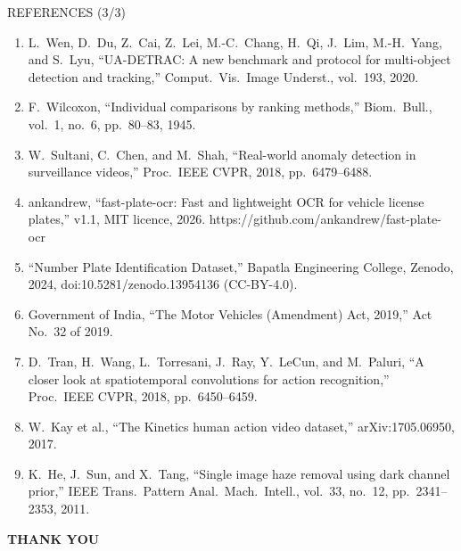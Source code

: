 \documentclass[aspectratio=169,10pt,t]{beamer}
\begin{document}
\begin{frame}{REFERENCES (3/3)}
\scriptsize
\begin{enumerate}\setlength{\itemsep}{0.05em}
\item[{[21]}] L.\ Wen, D.\ Du, Z.\ Cai, Z.\ Lei, M.-C.\ Chang, H.\ Qi, J.\ Lim, M.-H.\ Yang, and S.\ Lyu, ``UA-DETRAC: A new benchmark and protocol for multi-object detection and tracking,'' Comput.\ Vis.\ Image Underst., vol.\ 193, 2020.
\item[{[22]}] F.\ Wilcoxon, ``Individual comparisons by ranking methods,'' Biom.\ Bull., vol.\ 1, no.\ 6, pp.\ 80--83, 1945.
\item[{[23]}] W.\ Sultani, C.\ Chen, and M.\ Shah, ``Real-world anomaly detection in surveillance videos,'' Proc.\ IEEE CVPR, 2018, pp.\ 6479--6488.
\item[{[24]}] ankandrew, ``fast-plate-ocr: Fast and lightweight OCR for vehicle license plates,'' v1.1, MIT licence, 2026. https://github.com/ankandrew/fast-plate-ocr
\item[{[25]}] ``Number Plate Identification Dataset,'' Bapatla Engineering College, Zenodo, 2024, doi:10.5281/zenodo.13954136 (CC-BY-4.0).
\item[{[26]}] Government of India, ``The Motor Vehicles (Amendment) Act, 2019,'' Act No.\ 32 of 2019.
\item[{[27]}] D.\ Tran, H.\ Wang, L.\ Torresani, J.\ Ray, Y.\ LeCun, and M.\ Paluri, ``A closer look at spatiotemporal convolutions for action recognition,'' Proc.\ IEEE CVPR, 2018, pp.\ 6450--6459.
\item[{[28]}] W.\ Kay et al., ``The Kinetics human action video dataset,'' arXiv:1705.06950, 2017.
\item[{[29]}] K.\ He, J.\ Sun, and X.\ Tang, ``Single image haze removal using dark channel prior,'' IEEE Trans.\ Pattern Anal.\ Mach.\ Intell., vol.\ 33, no.\ 12, pp.\ 2341--2353, 2011.
\end{enumerate}
\end{frame}


\begin{frame}[c]{\phantom{T}}
\centering
{\fontsize{30}{34}\selectfont\bfseries\color{dsblue} THANK YOU}
\end{frame}
\end{document}
